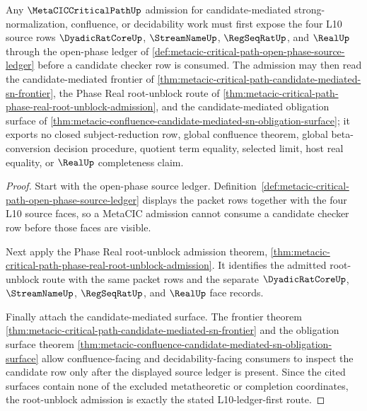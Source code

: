 \begin{theorem}
\label{thm:metaciccriticalpath-root-unblock-admission}
Any $\MetaCICCriticalPathUp$ admission for candidate-mediated strong-normalization, confluence, or decidability work must first expose the four L10 source rows $\DyadicRatCoreUp$, $\StreamNameUp$, $\RegSeqRatUp$, and $\RealUp$ through the open-phase ledger of \autoref{def:metacic-critical-path-open-phase-source-ledger} before a candidate checker row is consumed. The admission may then read the candidate-mediated frontier of \autoref{thm:metacic-critical-path-candidate-mediated-sn-frontier}, the Phase Real root-unblock route of \autoref{thm:metacic-critical-path-phase-real-root-unblock-admission}, and the candidate-mediated obligation surface of \autoref{thm:metacic-confluence-candidate-mediated-sn-obligation-surface}; it exports no closed subject-reduction row, global confluence theorem, global beta-conversion decision procedure, quotient term equality, selected limit, host real equality, or $\RealUp$ completeness claim.
\end{theorem}
\begin{proof}
Start with the open-phase source ledger. Definition~\ref{def:metacic-critical-path-open-phase-source-ledger} displays the packet rows together with the four L10 source faces, so a MetaCIC admission cannot consume a candidate checker row before those faces are visible.

Next apply the Phase Real root-unblock admission theorem, \autoref{thm:metacic-critical-path-phase-real-root-unblock-admission}. It identifies the admitted root-unblock route with the same packet rows and the separate $\DyadicRatCoreUp$, $\StreamNameUp$, $\RegSeqRatUp$, and $\RealUp$ face records.

Finally attach the candidate-mediated surface. The frontier theorem \autoref{thm:metacic-critical-path-candidate-mediated-sn-frontier} and the obligation surface theorem \autoref{thm:metacic-confluence-candidate-mediated-sn-obligation-surface} allow confluence-facing and decidability-facing consumers to inspect the candidate row only after the displayed source ledger is present. Since the cited surfaces contain none of the excluded metatheoretic or completion coordinates, the root-unblock admission is exactly the stated L10-ledger-first route.
\end{proof}
